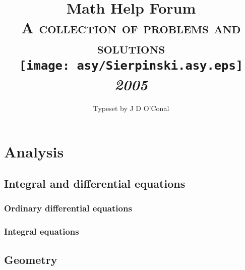 \documentclass[a4paper]{book}
\makeatletter
\renewcommand\tableofcontents{%
    \if@twocolumn
      \@restonecoltrue\onecolumn
    \else
      \@restonecolfalse
    \fi
    \chapter*{\contentsname}%
        \@mkboth{%
           \MakeUppercase\contentsname}{\MakeUppercase\contentsname}%
    \@starttoc{toc}%
    \if@restonecol\twocolumn\fi
    }
\makeatother
\begin{document}
    \title{Math Help Forum\\\vspace{12pt}\Large\textsc{A collection of problems and solutions}\\\vspace{24pt}\texttt{[image: asy/Sierpinski.asy.eps]}\\\vspace{24pt}\Huge\textit{2005}}
    \author{Typeset by J D O'Conal}
    \date{}

    \maketitle

    \tableofcontents

	\part{Analysis}

	\chapter{Integral and differential equations}

    \section{Ordinary differential equations}

    
    

    \section{Integral equations}

    
    
    
	

    \chapter{Geometry}
    
	
\end{document}
